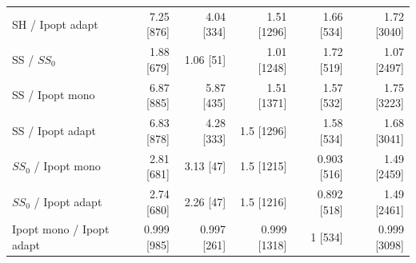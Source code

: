 \begin{tabular}{@{}lrrrrr@{}}
SH / Ipopt adapt & 7.25 [876] & 4.04 [334] & 1.51 [1296] & 1.66 [534] & 1.72 [3040] \\
SS / $SS_0$ & 1.88 [679] & 1.06 [51] & 1.01 [1248] & 1.72 [519] & 1.07 [2497] \\
SS / Ipopt mono & 6.87 [885] & 5.87 [435] & 1.51 [1371] & 1.57 [532] & 1.75 [3223] \\
SS / Ipopt adapt & 6.83 [878] & 4.28 [333] & 1.5 [1296] & 1.58 [534] & 1.68 [3041] \\
$SS_0$ / Ipopt mono & 2.81 [681] & 3.13 [47] & 1.5 [1215] & 0.903 [516] & 1.49 [2459] \\
$SS_0$ / Ipopt adapt & 2.74 [680] & 2.26 [47] & 1.5 [1216] & 0.892 [518] & 1.49 [2461] \\
Ipopt mono / Ipopt adapt & 0.999 [985] & 0.997 [261] & 0.999 [1318] & 1 [534] & 0.999 [3098] \\
\bottomrule
\end{tabular}
